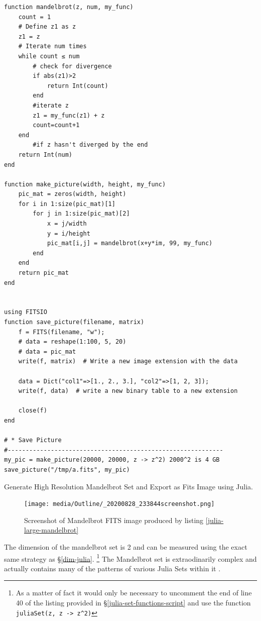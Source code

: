 \documentclass[a4paper,11pt,twoside]{article}
\begin{document}
\newpage
\begin{listing}[htbp]
\begin{verbatim}
function mandelbrot(z, num, my_func)
    count = 1
    # Define z1 as z
    z1 = z
    # Iterate num times
    while count ≤ num
        # check for divergence
        if abs(z1)>2
            return Int(count)
        end
        #iterate z
        z1 = my_func(z1) + z
        count=count+1
    end
        #if z hasn't diverged by the end
    return Int(num)
end

function make_picture(width, height, my_func)
    pic_mat = zeros(width, height)
    for i in 1:size(pic_mat)[1]
        for j in 1:size(pic_mat)[2]
            x = j/width
            y = i/height
            pic_mat[i,j] = mandelbrot(x+y*im, 99, my_func)
        end
    end
    return pic_mat
end


using FITSIO
function save_picture(filename, matrix)
    f = FITS(filename, "w");
    # data = reshape(1:100, 5, 20)
    # data = pic_mat
    write(f, matrix)  # Write a new image extension with the data

    data = Dict("col1"=>[1., 2., 3.], "col2"=>[1, 2, 3]);
    write(f, data)  # write a new binary table to a new extension

    close(f)
end

# * Save Picture
#------------------------------------------------------------
my_pic = make_picture(20000, 20000, z -> z^2) 2000^2 is 4 GB
save_picture("/tmp/a.fits", my_pic)

\end{verbatim}
\caption{\label{julia-large-mandelbrot}Generate High Resolution Mandelbrot Set and Export as Fits Image using Julia.}
\end{listing}

\begin{figure}[htbp]
\centering
\texttt{[image: media/Outline/\_20200828\_233844screenshot.png]}
\caption{\label{mandelbrot-screen}Screenshot of Mandelbrot FITS image produced by listing \ref{julia-large-mandelbrot}}
\end{figure}


The dimension of the mandelbrot set is 2 \cite{bownScienceMandelbrotSet} and can be measured using the exact same strategy as \S \ref{dim-julia}. \footnote{As a matter of fact it would only be necessary to uncomment the end of line 40 of the listing provided in \S \ref{julia-set-functions-script} and use the function \texttt{juliaSet(z, z -> z\textasciicircum{}2)}} The Mandelbrot set is extraodinarily complex and actually contains many of the patterns of various Julia Sets within it \cite[Ch. 14]{peitgenChaosFractalsNew2004}.
\end{document}
